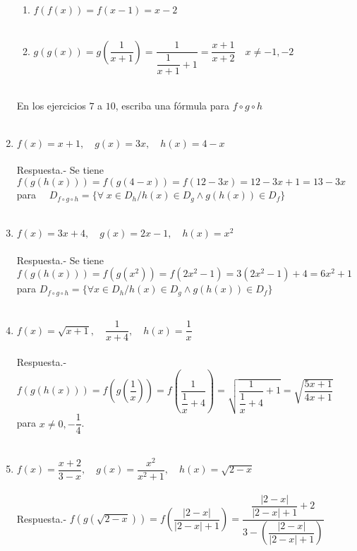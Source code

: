\begin{enumerate}
\begin{enumerate}[\bfseries a.]
    \item $f(f(x)) = f(x-1) = x - 2$\\\\
    
    \item $g(g(x)) = g\left(\dfrac{1}{x+1}\right) = \dfrac{1}{\dfrac{1}{x+1} + 1} = \dfrac{x+1}{x+2} \quad x\neq -1, -2$\\\\

\end{enumerate}

En los ejercicios $7$ a $10$, escriba una fórmula para $f\circ g \circ h$\\\\

\item $f(x)=x+1, \quad g(x)=3x, \quad h(x)=4-x$\\\\
    Respuesta.-\; Se tiene $f(g(h(x))) = f(g(4-x)) = f(12-3x) = 12-3x + 1 = 13 - 3x \quad $ para $\quad D_{f\circ g\circ h} = \lbrace \forall \; x \in D_h / h(x) \in D_g \land g(h(x)) \in D_f\rbrace$\\\\

\item $f(x)=3x+4, \quad g(x)=2x-1, \quad h(x)=x^2$\\\\
    Respuesta.-\; Se tiene $f(g(h(x))) = f(g(x^2)) = f(2x^2-1) = 3(2x^2-1) + 4 = 6x^2 +1 $ para $D_{f\circ g\circ h}= \lbrace \forall x \in D_h / h(x) \in D_g \land g(h(x)) \in D_f \rbrace$\\\\

\item $f(x)=\sqrt{x+1},\quad \dfrac{1}{x+4}, \quad h(x)=\dfrac{1}{x}$\\\\ 
    Respuesta.-\; $f(g(h(x))) = f\left(g \left(\dfrac{1}{x}\right) \right) = f\left(\dfrac{1}{\dfrac{1}{x} + 4}\right) = \sqrt{\dfrac{1}{\dfrac{1}{x} + 4} + 1} = \sqrt{\dfrac{5x+1}{4x+1}}$ para $ x \neq 0, -\dfrac{1}{4}$.\\\\

\item $f(x)=\dfrac{x+2}{3-x}, \quad g(x)=\dfrac{x^2}{x^2+1}, \quad h(x)=\sqrt{2-x}$\\\\
    Respuesta.-\; $f\left( g \left( \sqrt{2-x}\right)\right) = f\left( \dfrac{|2-x|}{|2-x|+1}\right) = \dfrac{\dfrac{|2-x|}{|2-x|+1} + 2}{3 - \left(\dfrac{|2-x|}{|2-x|+1}\right)}$\\\\


\end{enumerate}
